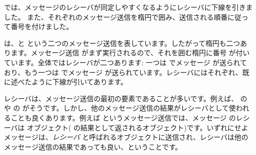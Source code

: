 \documentclass[a4paper,10pt,twoside]{book}
\begin{document}


 では、メッセージのレシーバが同定しやすくなるようにレシーバに下線を引きました。
また、それぞれのメッセージ送信を楕円で囲み、送信される順番に従って番号を付けました。


 は、と  という二つのメッセージ送信を表しています。したがって楕円も二つあります。メッセージ送信  がまず実行されるので、それを囲む楕円に番号  が付いています。全体ではレシーバが二つあります: 一つは  でメッセージ  が送られており、もう一つは  でメッセージ  が送られています。レシーバにはそれぞれ、既に述べたように下線が引いてあります。

レシーバは、メッセージ送信の最初の要素であることが多いです。例えば、 の  や  の  がそうです。しかし、他のメッセージ送信の結果がレシーバとして使われることも良くあります。例えば  というメッセージ送信では、メッセージ  のレシーバは  オブジェクト( の結果として返されるオブジェクト)です。いずれにせよメッセージは、\emph{レシーバ} と呼ばれるオブジェクトに送信され、レシーバは他のメッセージ送信の結果であっても良い、ということです。
\end{document}
